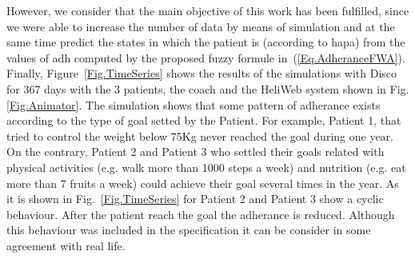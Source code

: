 \documentclass{llncs}
\begin{document}
However, we consider that the main objective of this work has been fulfilled, since we were able to increase the number of data by means of simulation and at the same time predict the states in which the patient is (according to hapa) from the values of adh computed by the proposed fuzzy formule in~(\ref{Eq.AdheranceFWA}). Finally, Figure~\ref{Fig.TimeSeries} shows the results of the simulations with Disco for 367 days with the 3 patients, the coach and the HeliWeb system shown in Fig.\ref{Fig.Animator}. The simulation shows that some pattern of adherance exists according to the type of goal setted by the Patient. For example, Patient 1, that tried to control the weight below 75Kg never reached the goal during one year. On the contrary, Patient 2 and Patient 3 who settled their goals related with physical activities (e.g. walk more than 1000 steps a week) and nutrition (e.g. eat more than 7 fruits a week) could achieve their goal several times in the year.  As it is shown in Fig.~\ref{Fig.TimeSeries} for Patient 2 and Patient 3 show a cyclic behaviour. After the patient reach the goal the adherance is reduced. Although this behaviour was included in the specification it can be consider in some agreement with real life. 
\end{document}
